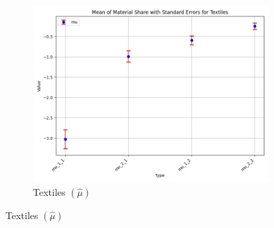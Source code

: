 \documentclass{article}
\begin{document}
\begin{figure}[ht!]
\begin{subfigure}[t]{0.32\textwidth}
        \includegraphics[width=\textwidth]{figure/empirical_stat_mixture_mu_with_error_bars_Textiles.png}
        \caption{Textiles $(\hat\mu)$}
    \end{subfigure}
\end{figure}
\end{document}
